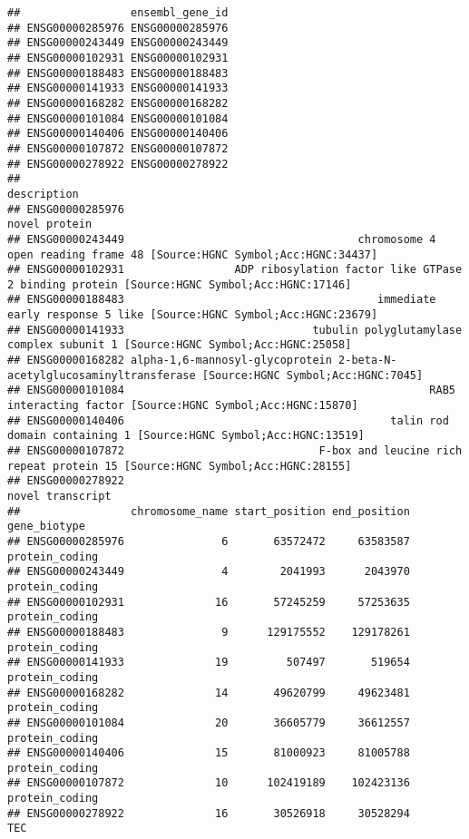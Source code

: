 \documentclass[
]{article}
\begin{document}
\begin{verbatim}
##                 ensembl_gene_id
## ENSG00000285976 ENSG00000285976
## ENSG00000243449 ENSG00000243449
## ENSG00000102931 ENSG00000102931
## ENSG00000188483 ENSG00000188483
## ENSG00000141933 ENSG00000141933
## ENSG00000168282 ENSG00000168282
## ENSG00000101084 ENSG00000101084
## ENSG00000140406 ENSG00000140406
## ENSG00000107872 ENSG00000107872
## ENSG00000278922 ENSG00000278922
##                                                                                                               description
## ENSG00000285976                                                                                             novel protein
## ENSG00000243449                                    chromosome 4 open reading frame 48 [Source:HGNC Symbol;Acc:HGNC:34437]
## ENSG00000102931                 ADP ribosylation factor like GTPase 2 binding protein [Source:HGNC Symbol;Acc:HGNC:17146]
## ENSG00000188483                                       immediate early response 5 like [Source:HGNC Symbol;Acc:HGNC:23679]
## ENSG00000141933                             tubulin polyglutamylase complex subunit 1 [Source:HGNC Symbol;Acc:HGNC:25058]
## ENSG00000168282 alpha-1,6-mannosyl-glycoprotein 2-beta-N-acetylglucosaminyltransferase [Source:HGNC Symbol;Acc:HGNC:7045]
## ENSG00000101084                                               RAB5 interacting factor [Source:HGNC Symbol;Acc:HGNC:15870]
## ENSG00000140406                                         talin rod domain containing 1 [Source:HGNC Symbol;Acc:HGNC:13519]
## ENSG00000107872                              F-box and leucine rich repeat protein 15 [Source:HGNC Symbol;Acc:HGNC:28155]
## ENSG00000278922                                                                                          novel transcript
##                 chromosome_name start_position end_position   gene_biotype
## ENSG00000285976               6       63572472     63583587 protein_coding
## ENSG00000243449               4        2041993      2043970 protein_coding
## ENSG00000102931              16       57245259     57253635 protein_coding
## ENSG00000188483               9      129175552    129178261 protein_coding
## ENSG00000141933              19         507497       519654 protein_coding
## ENSG00000168282              14       49620799     49623481 protein_coding
## ENSG00000101084              20       36605779     36612557 protein_coding
## ENSG00000140406              15       81000923     81005788 protein_coding
## ENSG00000107872              10      102419189    102423136 protein_coding
## ENSG00000278922              16       30526918     30528294            TEC

\end{verbatim}
\end{document}
